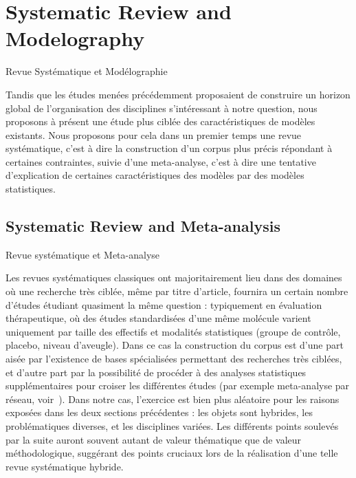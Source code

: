 



\newpage

\section{Systematic Review and Modelography}{Revue Systématique et Modélographie}

\label{sec:modelography}



Tandis que les études menées précédemment proposaient de construire un horizon global de l'organisation des disciplines s'intéressant à notre question, nous proposons à présent une étude plus ciblée des caractéristiques de modèles existants. Nous proposons pour cela dans un premier temps une revue systématique, c'est à dire la construction d'un corpus plus précis répondant à certaines contraintes, suivie d'une meta-analyse, c'est à dire une tentative d'explication de certaines caractéristiques des modèles par des modèles statistiques.


\subsection{Systematic Review and Meta-analysis}{Revue systématique et Meta-analyse}



Les revues systématiques classiques ont majoritairement lieu dans des domaines où une recherche très ciblée, même par titre d'article, fournira un certain nombre d'études étudiant quasiment la même question : typiquement en évaluation thérapeutique, où des études standardisées d'une même molécule varient uniquement par taille des effectifs et modalités statistiques (groupe de contrôle, placebo, niveau d'aveugle). Dans ce cas la construction du corpus est d'une part aisée par l'existence de bases spécialisées permettant des recherches très ciblées, et d'autre part par la possibilité de procéder à des analyses statistiques supplémentaires pour croiser les différentes études (par exemple meta-analyse par réseau, voir~\cite{rucker2012network}). Dans notre cas, l'exercice est bien plus aléatoire pour les raisons exposées dans les deux sections précédentes : les objets sont hybrides, les problématiques diverses, et les disciplines variées. Les différents points soulevés par la suite auront souvent autant de valeur thématique que de valeur méthodologique, suggérant des points cruciaux lors de la réalisation d'une telle revue systématique hybride.


